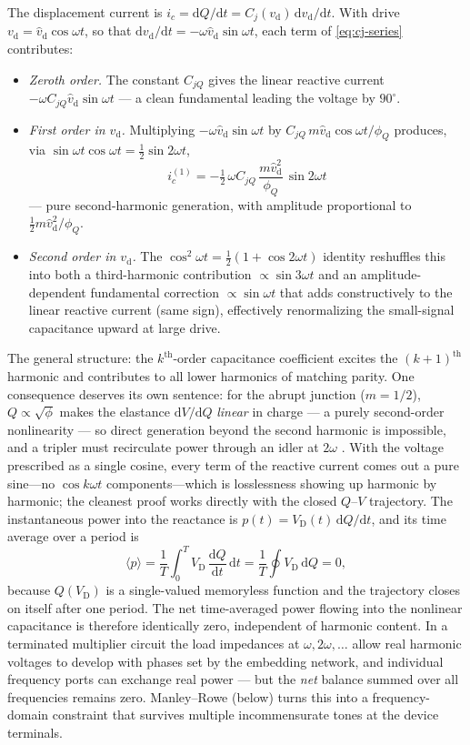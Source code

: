 \documentclass[12pt]{article}
\newcommand{\VD}{V_{\mathrm{D}}}
\newcommand{\vd}{v_{\mathrm{d}}}
\newcommand{\vhd}{\hat{v}_{\mathrm{d}}}
\newcommand{\dd}{\mathrm{d}}        %
\begin{document}
The displacement current is $i_c = \dd Q/\dd t = C_j(\vd)\, \dd\vd/\dd t$. With drive $\vd = \vhd\cos\omega t$, so that $\dd\vd/\dd t = -\omega\vhd\sin\omega t$, each term of \eqref{eq:cj-series} contributes:
\begin{itemize}
    \item \emph{Zeroth order.} The constant $C_{jQ}$ gives the linear reactive current $-\omega C_{jQ}\vhd\sin\omega t$ --- a clean fundamental leading the voltage by $90^\circ$.
    \item \emph{First order in $\vd$.} Multiplying $-\omega\vhd\sin\omega t$ by $C_{jQ}\,m\vhd\cos\omega t/\phi_Q$ produces, via $\sin\omega t \cos\omega t = \tfrac{1}{2}\sin 2\omega t$,
    \begin{equation*}
        i_c^{(1)} = -\tfrac{1}{2}\,\omega C_{jQ}\,\frac{m \vhd^2}{\phi_Q}\,\sin 2\omega t
    \end{equation*}
    --- pure second-harmonic generation, with amplitude proportional to $\tfrac{1}{2}m\vhd^2/\phi_Q$.
    \item \emph{Second order in $\vd$.} The $\cos^2\omega t = \tfrac{1}{2}(1 + \cos 2\omega t)$ identity reshuffles this into both a third-harmonic contribution $\propto \sin 3\omega t$ and an amplitude-dependent fundamental correction $\propto \sin\omega t$ that adds constructively to the linear reactive current (same sign), effectively renormalizing the small-signal capacitance upward at large drive.
\end{itemize}
The general structure: the $k^{\text{th}}$-order capacitance coefficient excites the $(k+1)^{\text{th}}$ harmonic and contributes to all lower harmonics of matching parity. One consequence deserves its own sentence: for the abrupt junction ($m = 1/2$), $Q \propto \sqrt{\phi}$ makes the elastance $\dd V/\dd Q$ \emph{linear} in charge --- a purely second-order nonlinearity --- so direct generation beyond the second harmonic is impossible, and a tripler must recirculate power through an idler at $2\omega$ \cite{penfieldrafuse}. With the voltage prescribed as a single cosine, every term of the reactive current comes out a pure sine---no $\cos k\omega t$ components---which is losslessness showing up harmonic by harmonic; the cleanest proof works directly with the closed $Q$--$V$ trajectory. The instantaneous power into the reactance is $p(t) = \VD(t)\,\dd Q/\dd t$, and its time average over a period is
\begin{equation}
\langle p \rangle = \frac{1}{T}\int_0^T \VD\,\frac{\dd Q}{\dd t}\,\dd t = \frac{1}{T}\oint \VD\,\dd Q = 0,
\label{eq:lossless-vdq}
\end{equation}
because $Q(\VD)$ is a single-valued memoryless function and the trajectory closes on itself after one period. The net time-averaged power flowing into the nonlinear capacitance is therefore identically zero, independent of harmonic content. In a terminated multiplier circuit the load impedances at $\omega, 2\omega, \ldots$ allow real harmonic voltages to develop with phases set by the embedding network, and individual frequency ports can exchange real power --- but the \emph{net} balance summed over all frequencies remains zero. Manley--Rowe (below) turns this into a frequency-domain constraint that survives multiple incommensurate tones at the device terminals.
\end{document}
